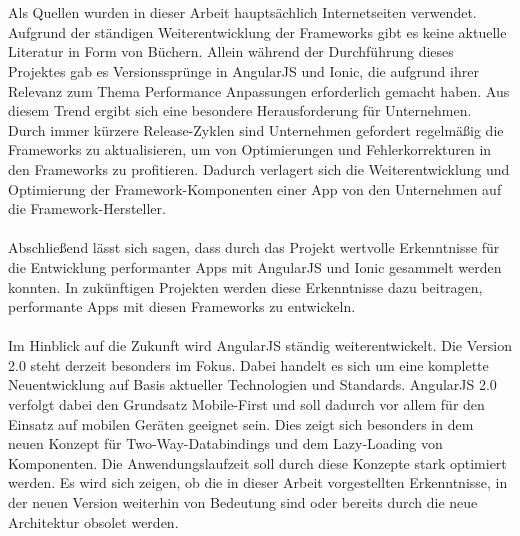 \\\\
Als Quellen wurden in dieser Arbeit hauptsächlich Internetseiten verwendet. Aufgrund der ständigen Weiterentwicklung der Frameworks gibt es keine aktuelle Literatur in Form von Büchern. Allein während der Durchführung dieses Projektes gab es Versionssprünge in AngularJS und Ionic, die aufgrund ihrer Relevanz zum Thema Performance Anpassungen erforderlich gemacht haben. Aus diesem Trend ergibt sich eine besondere Herausforderung für Unternehmen. Durch immer kürzere Release-Zyklen sind Unternehmen gefordert regelmäßig die Frameworks zu aktualisieren, um von Optimierungen und Fehlerkorrekturen in den Frameworks zu profitieren. Dadurch verlagert sich die Weiterentwicklung und Optimierung der Framework-Komponenten einer App von den Unternehmen auf die Framework-Hersteller. 
\\\\
Abschließend lässt sich sagen, dass durch das Projekt wertvolle Erkenntnisse für die Entwicklung performanter Apps mit AngularJS und Ionic gesammelt werden konnten. In zukünftigen Projekten werden diese Erkenntnisse dazu beitragen, performante Apps mit diesen Frameworks zu entwickeln. 
\\\\
Im Hinblick auf die Zukunft wird AngularJS ständig weiterentwickelt. Die Version 2.0 steht derzeit besonders im Fokus. Dabei handelt es sich um eine komplette Neuentwicklung auf Basis aktueller Technologien und Standards. AngularJS 2.0 verfolgt dabei den Grundsatz Mobile-First und soll dadurch vor allem für den Einsatz auf mobilen Geräten geeignet sein. Dies zeigt sich besonders in dem neuen Konzept für Two-Way-Databindings und dem Lazy-Loading von Komponenten. Die Anwendungslaufzeit soll durch diese Konzepte stark optimiert werden\cite{AJS20}. Es wird sich zeigen, ob die in dieser Arbeit vorgestellten Erkenntnisse, in der neuen Version weiterhin von Bedeutung sind oder bereits durch die neue Architektur obsolet werden.

